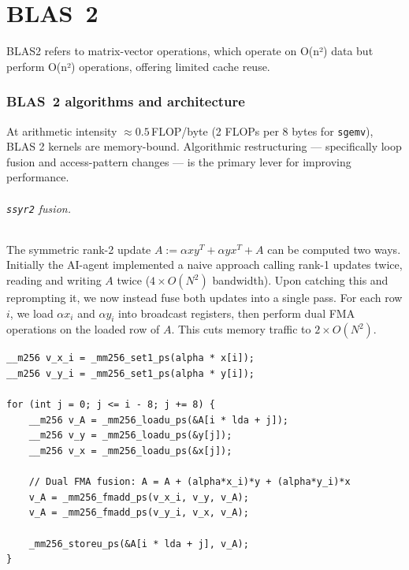 \documentclass[11pt,a4paper]{article}
\begin{document}
\newpage
\part{BLAS~2}

BLAS2 refers to matrix-vector operations, which operate on O(n²) data but perform O(n²) operations, offering limited cache reuse.

\section{BLAS~2 algorithms and architecture}

At arithmetic intensity $\approx 0.5$\,FLOP/byte (2 FLOPs per 8 bytes for \texttt{sgemv}), BLAS 2 kernels are memory-bound. Algorithmic restructuring — specifically loop fusion and access-pattern changes — is the primary lever for improving performance.

\paragraph{\texttt{ssyr2} fusion.}
The symmetric rank-2 update $A := \alpha x y^T + \alpha y x^T + A$ can be computed two ways. Initially the AI-agent implemented a naive approach calling rank-1 updates twice, reading and writing $A$ twice ($4 \times O(N^2)$ bandwidth). Upon catching this and reprompting it, we now instead fuse both updates into a single pass. For each row $i$, we load $\alpha x_i$ and $\alpha y_i$ into broadcast registers, then perform dual FMA operations on the loaded row of $A$. This cuts memory traffic to $2 \times O(N^2)$.

\begin{lstlisting}[caption={ssyr2 Fused AVX2 Inner Loop}]
__m256 v_x_i = _mm256_set1_ps(alpha * x[i]);
__m256 v_y_i = _mm256_set1_ps(alpha * y[i]);

for (int j = 0; j <= i - 8; j += 8) {
    __m256 v_A = _mm256_loadu_ps(&A[i * lda + j]);
    __m256 v_y = _mm256_loadu_ps(&y[j]);
    __m256 v_x = _mm256_loadu_ps(&x[j]);
    
    // Dual FMA fusion: A = A + (alpha*x_i)*y + (alpha*y_i)*x
    v_A = _mm256_fmadd_ps(v_x_i, v_y, v_A);
    v_A = _mm256_fmadd_ps(v_y_i, v_x, v_A);
    
    _mm256_storeu_ps(&A[i * lda + j], v_A);
}
\end{lstlisting}
\end{document}
